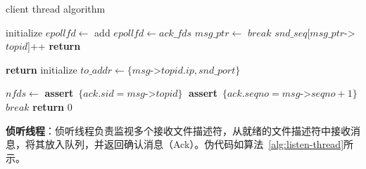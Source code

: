 {\begin{enumerate}[label=\arabic*.]
              \begin{algorithm}[H]
                  \caption{client thread algorithm}\label{alg:client-thread}
                  \begin{algorithmic}[1] %
                      \State initialize $epollfd \gets$ 
                      \State add $epollfd \gets ack\_fds$
                      \State {}
                      \State $msg\_ptr \gets$ 
                      \State $break$
                      \EndIf
                      \EndFor
                      \State $snd\_seq[msg\_ptr$->$topid]$++
                      \State {}
                      \EndWhile
                      \State \textbf{return}
                      \EndProcedure

                      \State \textbf{return} 
                      \Else
                      \State initialize $to\_addr \gets \{msg$->$topid.ip,snd\_port \}$
                      \State {}
                      \EndIf

                      \State $nfds \gets$ 
                      \State {}
                      \State \textbf{assert}~$\{ack.sid = msg$->$topid\}\;$
                      \State \textbf{assert}~$\{ack.seqno = msg$->$seqno+1\}\;$
                      \State $break$
                      \EndWhile
                      \State \textbf{return} $0$
                      \EndFunction
                  \end{algorithmic}
              \end{algorithm}

              \textbf{侦听线程}：侦听线程负责监视多个接收文件描述符，从就绪的文件描述符中接收消息，将其放入队列，并返回确认消息（Ack）。伪代码如算法~\ref{alg:listen-thread}所示。


\end{enumerate}}
